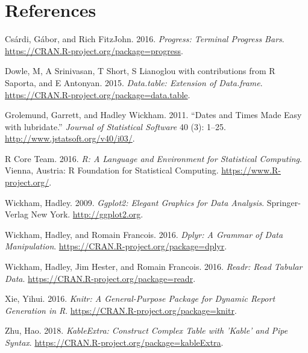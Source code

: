\documentclass[]{article}
\begin{document}
\section*{References}\label{references}

\hypertarget{refs}{}
\hypertarget{ref-progress}{}
Csárdi, Gábor, and Rich FitzJohn. 2016. \emph{Progress: Terminal
Progress Bars}. \url{https://CRAN.R-project.org/package=progress}.

\hypertarget{ref-data.table}{}
Dowle, M, A Srinivasan, T Short, S Lianoglou with contributions from R
Saporta, and E Antonyan. 2015. \emph{Data.table: Extension of
Data.frame}. \url{https://CRAN.R-project.org/package=data.table}.

\hypertarget{ref-lubridate}{}
Grolemund, Garrett, and Hadley Wickham. 2011. ``Dates and Times Made
Easy with lubridate.'' \emph{Journal of Statistical Software} 40 (3):
1--25. \url{http://www.jstatsoft.org/v40/i03/}.

\hypertarget{ref-baseR}{}
R Core Team. 2016. \emph{R: A Language and Environment for Statistical
Computing}. Vienna, Austria: R Foundation for Statistical Computing.
\url{https://www.R-project.org/}.

\hypertarget{ref-ggplot2}{}
Wickham, Hadley. 2009. \emph{Ggplot2: Elegant Graphics for Data
Analysis}. Springer-Verlag New York. \url{http://ggplot2.org}.

\hypertarget{ref-dplyr}{}
Wickham, Hadley, and Romain Francois. 2016. \emph{Dplyr: A Grammar of
Data Manipulation}. \url{https://CRAN.R-project.org/package=dplyr}.

\hypertarget{ref-readr}{}
Wickham, Hadley, Jim Hester, and Romain Francois. 2016. \emph{Readr:
Read Tabular Data}. \url{https://CRAN.R-project.org/package=readr}.

\hypertarget{ref-knitr}{}
Xie, Yihui. 2016. \emph{Knitr: A General-Purpose Package for Dynamic
Report Generation in R}. \url{https://CRAN.R-project.org/package=knitr}.

\hypertarget{ref-kableExtra}{}
Zhu, Hao. 2018. \emph{KableExtra: Construct Complex Table with 'Kable'
and Pipe Syntax}. \url{https://CRAN.R-project.org/package=kableExtra}.
\end{document}
